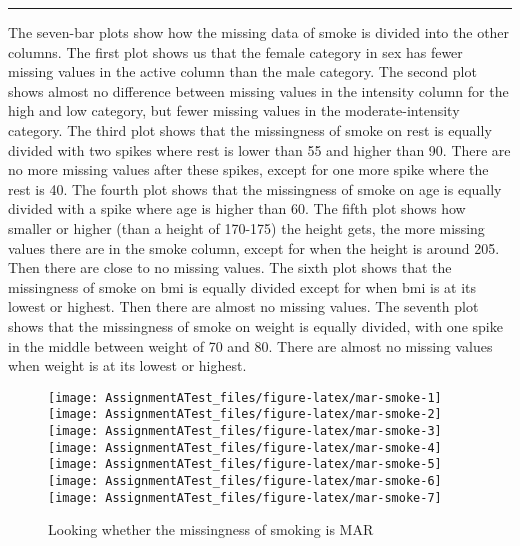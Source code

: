 \documentclass[
]{article}
\begin{document}
\begin{center}\rule{0.5\linewidth}{0.5pt}\end{center}

The seven-bar plots show how the missing data of smoke is divided into the other columns. The first plot shows us that the female category in sex has fewer missing values in the active column than the male category. The second plot shows almost no difference between missing values in the intensity column for the high and low category, but fewer missing values in the moderate-intensity category. The third plot shows that the missingness of smoke on rest is equally divided with two spikes where rest is lower than 55 and higher than 90. There are no more missing values after these spikes, except for one more spike where the rest is 40. The fourth plot shows that the missingness of smoke on age is equally divided with a spike where age is higher than 60. The fifth plot shows how smaller or higher (than a height of 170-175) the height gets, the more missing values there are in the smoke column, except for when the height is around 205. Then there are close to no missing values. The sixth plot shows that the missingness of smoke on bmi is equally divided except for when bmi is at its lowest or highest. Then there are almost no missing values. The seventh plot shows that the missingness of smoke on weight is equally divided, with one spike in the middle between weight of 70 and 80. There are almost no missing values when weight is at its lowest or highest.

\begin{figure}
\texttt{[image: AssignmentATest\_files/figure-latex/mar-smoke-1]} \texttt{[image: AssignmentATest\_files/figure-latex/mar-smoke-2]} \texttt{[image: AssignmentATest\_files/figure-latex/mar-smoke-3]} \texttt{[image: AssignmentATest\_files/figure-latex/mar-smoke-4]} \texttt{[image: AssignmentATest\_files/figure-latex/mar-smoke-5]} \texttt{[image: AssignmentATest\_files/figure-latex/mar-smoke-6]} \texttt{[image: AssignmentATest\_files/figure-latex/mar-smoke-7]} \caption{Looking whether the missingness of smoking is MAR}\label{fig:mar-smoke}
\end{figure}
\end{document}
